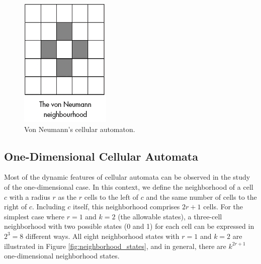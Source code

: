 \documentclass[9pt,a4paper,twoside]{tau-class/tau}
\begin{document}
    \begin{figure}[H]
        \centering
        \includegraphics[width=0.75\columnwidth]{figures/vonNeumann.png}
        \caption{Von Neumann's cellular automaton.}
        \label{fig:vonNeumann}
    \end{figure}


    \subsection{One-Dimensional Cellular Automata}


    Most of the dynamic features of cellular automata can be observed in the study of the one-dimensional case. In this context, we define the neighborhood of a cell \( c \) with a radius \( r \) as the \( r \) cells to the left of \( c \) and the same number of cells to the right of \( c \). Including \( c \) itself, this neighborhood comprises \( 2r + 1 \) cells. For the simplest case where \( r = 1 \) and \( k = 2 \) (the allowable states), a three-cell neighborhood with two possible states (0 and 1) for each cell can be expressed in \( 2^3 = 8 \) different ways. All eight neighborhood states with \( r = 1 \) and \( k = 2 \) are illustrated in Figure \ref{fig:neighborhood_states}, and in general, there are \( k^{2r+1} \) one-dimensional neighborhood states.\cite{schiff2007}
    
\end{document}
